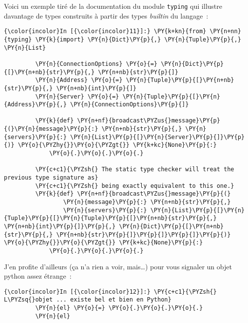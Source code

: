     Voici un exemple tiré de la documentation du module \texttt{typing} qui
illustre davantage de types construits à partir des types \emph{builtin}
du langage~:

    \begin{Verbatim}[commandchars=\\\{\},frame=single,framerule=0.3mm,rulecolor=\color{cellframecolor}]
{\color{incolor}In [{\color{incolor}11}]:} \PY{k+kn}{from} \PY{n+nn}{typing} \PY{k}{import} \PY{n}{Dict}\PY{p}{,} \PY{n}{Tuple}\PY{p}{,} \PY{n}{List}
         
         \PY{n}{ConnectionOptions} \PY{o}{=} \PY{n}{Dict}\PY{p}{[}\PY{n+nb}{str}\PY{p}{,} \PY{n+nb}{str}\PY{p}{]}
         \PY{n}{Address} \PY{o}{=} \PY{n}{Tuple}\PY{p}{[}\PY{n+nb}{str}\PY{p}{,} \PY{n+nb}{int}\PY{p}{]}
         \PY{n}{Server} \PY{o}{=} \PY{n}{Tuple}\PY{p}{[}\PY{n}{Address}\PY{p}{,} \PY{n}{ConnectionOptions}\PY{p}{]}
         
         \PY{k}{def} \PY{n+nf}{broadcast\PYZus{}message}\PY{p}{(}\PY{n}{message}\PY{p}{:} \PY{n+nb}{str}\PY{p}{,} \PY{n}{servers}\PY{p}{:} \PY{n}{List}\PY{p}{[}\PY{n}{Server}\PY{p}{]}\PY{p}{)} \PY{o}{\PYZhy{}}\PY{o}{\PYZgt{}} \PY{k+kc}{None}\PY{p}{:}
             \PY{o}{.}\PY{o}{.}\PY{o}{.}
         
         \PY{c+c1}{\PYZsh{} The static type checker will treat the previous type signature as}
         \PY{c+c1}{\PYZsh{} being exactly equivalent to this one.}
         \PY{k}{def} \PY{n+nf}{broadcast\PYZus{}message}\PY{p}{(}
                 \PY{n}{message}\PY{p}{:} \PY{n+nb}{str}\PY{p}{,}
                 \PY{n}{servers}\PY{p}{:} \PY{n}{List}\PY{p}{[}\PY{n}{Tuple}\PY{p}{[}\PY{n}{Tuple}\PY{p}{[}\PY{n+nb}{str}\PY{p}{,} \PY{n+nb}{int}\PY{p}{]}\PY{p}{,} \PY{n}{Dict}\PY{p}{[}\PY{n+nb}{str}\PY{p}{,} \PY{n+nb}{str}\PY{p}{]}\PY{p}{]}\PY{p}{]}\PY{p}{)} \PY{o}{\PYZhy{}}\PY{o}{\PYZgt{}} \PY{k+kc}{None}\PY{p}{:}
             \PY{o}{.}\PY{o}{.}\PY{o}{.}
\end{Verbatim}


    J'en profite d'ailleurs (ça n'a rien a voir, mais\ldots{}) pour vous
signaler un objet python assez étrange~:

    \begin{Verbatim}[commandchars=\\\{\},frame=single,framerule=0.3mm,rulecolor=\color{cellframecolor}]
{\color{incolor}In [{\color{incolor}12}]:} \PY{c+c1}{\PYZsh{} L\PYZsq{}objet ... existe bel et bien en Python}
         \PY{n}{el} \PY{o}{=} \PY{o}{.}\PY{o}{.}\PY{o}{.}
         \PY{n}{el}
\end{Verbatim}


